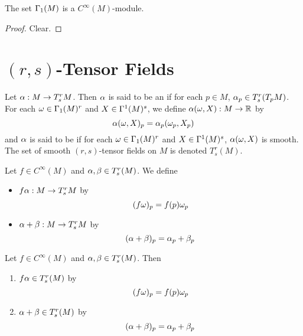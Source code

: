 \documentclass{book}
\begin{document}
	\begin{ex}
	The set $\Gamma_1(M)$ is a $C^{\infty}(M)$-module.
	\end{ex}
	
	\begin{proof}
	Clear.
	\end{proof}
	
	
	\begin{ex}
	
	\end{ex}
	
	
	
	
	
	
	
	
	\newpage
	\section{$(r,s)$-Tensor Fields}
	
	\begin{defn}
		Let $\alpha: M \rightarrow T^r_sM$. Then $\alpha$ is said to be an  if for each $p \in M$, $\alpha_p \in T^r_s(T_pM)$. \\
		For each $\omega \in \Gamma_1(M)^r$ and $X \in \Gamma^1(M)^s$, we define $\alpha(\omega, X) : M \rightarrow \mathbb{R}$ by $$\alpha(\omega, X)_p = \alpha_p(\omega_p, X_p)$$
		and $\alpha$ is said to be  if for each $\omega \in \Gamma_1(M)^r$ and $X \in \Gamma^1(M)^s$, $\alpha(\omega, X)$ is smooth. \\
		The set of smooth $(r,s)$-tensor fields on $M$ is denoted $T^r_s(M)$.\\
	\end{defn}

	\begin{defn}
	Let $f \in C^{\infty}(M)$ and $\alpha,\beta \in T^r_s(M)$. We define 
	\begin{itemize}
	\item $f\alpha: M \rightarrow T^r_sM$ by $$(f\omega)_p = f(p)\omega_p$$
	\item $\alpha+\beta:  M \rightarrow T^r_sM$ by $$(\alpha+\beta)_p = \alpha_p+\beta_p$$
	\end{itemize}
	\end{defn}
	
	\begin{ex}
	Let $f \in C^{\infty}(M)$ and $\alpha,\beta \in T^r_s(M)$. Then
	\begin{enumerate}
	\item $f\alpha \in T^r_s(M)$ by $$(f\omega)_p = f(p)\omega_p$$
	\item $\alpha+\beta \in T^r_s(M)$ by $$(\alpha+\beta)_p = \alpha_p+\beta_p$$
	\end{enumerate}
	\end{ex}
	
\end{document}
